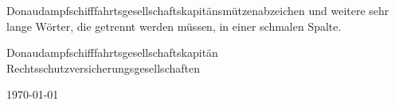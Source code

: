 \documentclass{article}
\begin{document}
Donaudampfschifffahrtsgesellschaftskapitänsmützenabzeichen und weitere sehr lange
Wörter, die getrennt werden müssen, in einer schmalen Spalte.
\parbox{3cm}{Donaudampfschifffahrtsgesellschaftskapitän Rechtsschutzversicherungsgesellschaften}
\today
\end{document}
